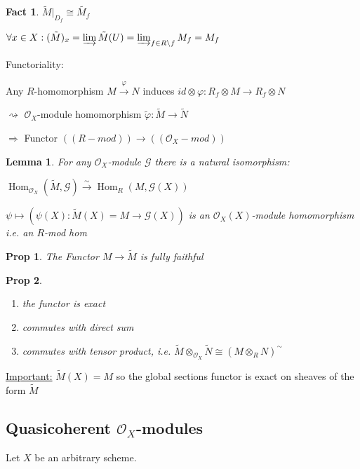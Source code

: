 \documentclass[a4paper, 12pt]{article}
\newcommand{\cag}{\mathcal{G}}
\newcommand{\oxmod}{$\mathcal{O}_X$-module }
\newcommand{\oxmods}{$\mathcal{O}_X$-modules }
\newcommand{\ox}{\mathcal{O}_X}
\newtheorem*{prop}{Prop}
\newtheorem*{lem}{Lemma}
\newtheorem*{fact}{Fact}
\DeclareMathOperator{\Hom}{Hom}
\begin{document}
	\begin{fact}
		$ \tilde{M}|_{D_f} \cong \tilde{M_f} $ 
		
		$ \forall x \in X : (\tilde{M})_x = \varinjlim \tilde{M}(U) = \varinjlim_{f \in R \setminus f } M_f = M_f $
	\end{fact}
	
	Functoriality:
	
	Any $ R $-homomorphism $ M \xrightarrow{\varphi} N $ induces $ id \otimes \varphi : R_f \otimes M \rightarrow R_f \otimes N $
	
	$ \rightsquigarrow  $ \oxmod homomorphism $ \tilde{\varphi} : \tilde{M} \rightarrow \tilde{N} $
	
	$ \Rightarrow  $ Functor $ ((R-mod)) \rightarrow ((\ox -mod)) $
	
	
	\begin{lem}
		For any \oxmod  $ \cag $ there is a natural isomorphism: 
		
		$ \Hom_{\ox}(\tilde{M} , \cag) \xrightarrow{\sim} \Hom_R (M, \cag(X))$
	
		$ \psi \mapsto (\psi(X) : \tilde{M}(X)= M \rightarrow \cag(X)) $ is an $ \ox(X) $-module homomorphism i.e. an $ R $-mod hom
	
	\end{lem}
	
	\begin{prop}
		The Functor $ M \rightarrow \tilde{M} $ is fully faithful
	\end{prop}
	
	\begin{prop}
		\begin{enumerate}
			\item the functor is exact
			\item commutes with direct sum
			\item commutes with tensor product, i.e. $ \tilde{M} \otimes_{\ox} \tilde{N}  \cong (M \otimes_R N)^{\sim} $
		\end{enumerate}
	\end{prop}
	
	\underline{Important:} $ \tilde{M}(X) = M $ so the global sections functor is exact on sheaves of the form $ \tilde{M} $
	
	
 
 	
	\subsection{Quasicoherent \oxmods}
	
	Let $ X $ be an arbitrary scheme.
	
\end{document}
